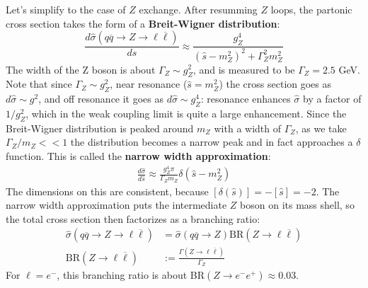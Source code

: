 \documentclass[11pt, oneside]{article}   	%
\theoremstyle{definition}
\numberwithin{equation}{subsection}		%
\begin{document}
Let's simplify to the case of $Z$ exchange. After resumming $Z$ loops, the partonic cross section takes the form of a \textbf{Breit-Wigner 
distribution}:
\begin{equation}
	\frac{d\hat\sigma(q\overline q\rightarrow Z\rightarrow\ell\overline\ell)}{d\hat s} \approx \frac{g_Z^4}{(\hat s - m_Z^2)^2 + \Gamma_Z^2 m_Z^2}
\end{equation}
The width of the Z boson is about $\Gamma_Z\sim g_Z^2$, and is measured to be $\Gamma_Z = 2.5$ GeV. Note that since $\Gamma_Z\sim 
g_Z^2$, near resonance ($\hat s = m_Z^2$) the cross section goes as $d\hat\sigma\sim g^2$, and off resonance it goes as $d\hat\sigma\sim 
g_Z^4$: resonance enhances $\hat\sigma$ by a factor of $1 / g_Z^2$, which in the weak coupling limit is quite a large enhancement. 
Since the Breit-Wigner distribution is peaked around $m_Z$ with a width of $\Gamma_Z$, as we take $\Gamma_Z / m_Z << 1$ the 
distribution becomes a narrow peak and in fact approaches a $\delta$ function. This is called the \textbf{narrow width approximation}:
\begin{align}
	\frac{d\hat\sigma}{d\hat s}\approx \frac{g_Z^4\pi}{\Gamma_Z m_Z} \delta(\hat s - m_Z^2)
\end{align}
The dimensions on this are consistent, because $[\delta(\hat s)] = - [\hat s] = -2$. The narrow width approximation puts the intermediate $Z$ 
boson on its mass shell, so the total cross section then factorizes as a branching ratio:
\begin{align}
	\hat\sigma(q\overline q\rightarrow Z \rightarrow\ell\overline\ell) &= \hat\sigma(q\overline q\rightarrow Z)\mathrm{BR}(Z\rightarrow\ell\overline\ell)\nonumber \\
	\mathrm{BR}(Z\rightarrow\ell\overline\ell) &:= \frac{\Gamma(Z\rightarrow\ell\overline\ell)}{\Gamma_Z}
\end{align}
For $\ell = e^-$, this branching ratio is about BR$(Z\rightarrow e^- e^+) \approx 0.03$. 
\end{document}
